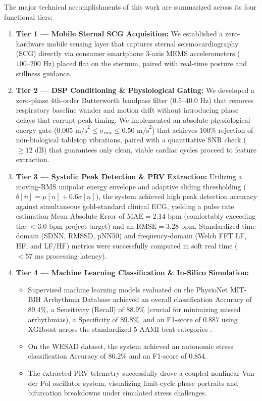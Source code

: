 The major technical accomplishments of this work are summarized across its four functional tiers:
\begin{enumerate}
    \item \textbf{Tier 1 --- Mobile Sternal SCG Acquisition:} We established a zero-hardware mobile sensing layer that captures sternal seismocardiography (SCG) directly via consumer smartphone 3-axis MEMS accelerometers ($100\text{--}200\text{ Hz}$) placed flat on the sternum, paired with real-time posture and stillness guidance.
    \item \textbf{Tier 2 --- DSP Conditioning \& Physiological Gating:} We developed a zero-phase 4th-order Butterworth bandpass filter ($0.5\text{--}40.0\text{ Hz}$) that removes respiratory baseline wander and motion drift without introducing phase delays that corrupt peak timing. We implemented an absolute physiological energy gate ($0.005\text{ m/s}^2 \le \sigma_{raw} \le 0.50\text{ m/s}^2$) that achieves $100\%$ rejection of non-biological tabletop vibrations, paired with a quantitative SNR check ($\ge 12\text{ dB}$) that guarantees only clean, viable cardiac cycles proceed to feature extraction.
    \item \textbf{Tier 3 --- Systolic Peak Detection \& PRV Extraction:} Utilizing a moving-RMS unipolar energy envelope and adaptive sliding thresholding ($\theta[n] = \mu[n] + 0.6\sigma[n]$), the system achieved high peak detection accuracy against simultaneous gold-standard clinical ECG, yielding a pulse rate estimation Mean Absolute Error of $\text{MAE} = 2.14\text{ bpm}$ (comfortably exceeding the $<3.0\text{ bpm}$ project target) and an $\text{RMSE} = 3.28\text{ bpm}$. Standardized time-domain (SDNN, RMSSD, pNN50) and frequency-domain (Welch FFT LF, HF, and LF/HF) metrics were successfully computed in soft real time ($<57\text{ ms}$ processing latency).
    \item \textbf{Tier 4 --- Machine Learning Classification \& In-Silico Simulation:} 
    \begin{itemize}
        \item Supervised machine learning models evaluated on the PhysioNet MIT-BIH Arrhythmia Database achieved an overall classification Accuracy of $89.4\%$, a Sensitivity (Recall) of $88.9\%$ (crucial for minimizing missed arrhythmias), a Specificity of $89.8\%$, and an F1-score of $0.887$ using XGBoost across the standardized 5 AAMI beat categories \cite{pandian2026internet}.
        \item On the WESAD dataset, the system achieved an autonomic stress classification Accuracy of $86.2\%$ and an F1-score of $0.854$.
        \item The extracted PRV telemetry successfully drove a coupled nonlinear Van der Pol oscillator system, visualizing limit-cycle phase portraits and bifurcation breakdowns under simulated stress challenges.
    \end{itemize}
\end{enumerate}

